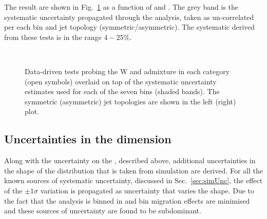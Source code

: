 The result are shown in Fig.~\ref{fig:closureBTag} as a function of
\HT and \njet.  The grey band is the systematic uncertainty
propagated through the analysis, taken as un-correlated per each
\scalht bin and jet topology (symmetric/asymmetric). The systematic
derived from these tests is in the range $4-25\%$.

\begin{figure}[h!]
  \begin{center}
    ~~
    \caption{Data-driven tests probing the W and \ttbar admixture 
      in each \njet category (open symbols) overlaid on top of the systematic
      uncertainty estimates used for each of the seven \scalht bins
      (shaded bands). 
      The symmetric (asymmetric) jet topologies are shown in the left (right) plot.      
    }
    \label{fig:closureBTag}
  \end{center} 
\end{figure}

\subsection{Uncertainties in the \MHT dimension}
\label{sec:systMht}

Along with the uncertainty on the \TFs, described above, additional
uncertainties in the shape of the \MHT distribution that is taken from
simulation are derived. For all the known sources of systematic
uncertainty, discussed in Sec.~\ref{sec:simUnc}, the effect of the $\pm 1\sigma$
variation is propagated as uncertainty that varies the \MHT shape.
Due to the fact that the analysis is binned in \HT and \nj bin
migration effects are minimised and these sources of uncertainty are
found to be subdominant.

